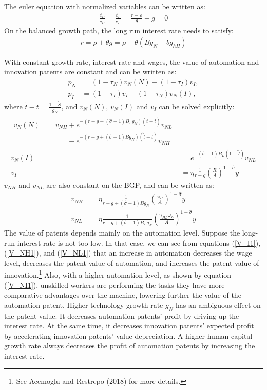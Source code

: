 \documentclass[12pt]{article}
\begin{document}
The euler equation with normalized variables can be written as: 
\begin{align*}
\frac{\dot{c_H}}{c_H} = \frac{\dot{c_L}}{c_L} = \frac{r-\rho}{\theta}-g = 0 
\end{align*}
On the balanced growth path, the long run interest rate needs to satisfy: 
\begin{align}
\label{LRR}
r = \rho+\theta g = \rho+\theta(Bg_N+bg_{hH})
\end{align}

With constant growth rate, interest rate and wages, the value of automation and innovation patents are constant and can be written as: 
\begin{align}
p_N &= (1-\tau_N)v_N(N)-(1-\tau_I)v_I,\\
p_I &= (1-\tau_I)v_I-(1-\tau_N)v_N(I), 
\end{align}
where $\tilde{t}-t =\frac{1-\tilde{S}}{g_N}$, and $v_N(N)$, $v_N(I)$ and $v_I$ can be solved explicitly: 
\begin{align}
\label{V_NN1}
\begin{split}
v_N(N) &= v_{NH}+e^{-(r-g+(\hat{\sigma}-1)B_Lg_N)(\tilde{t}-t)}v_{NL} \\
&\quad \quad \quad -e^{-(r-g+(\hat{\sigma}-1)Bg_N)(\tilde{t}-t)}v_{NH} 
\end{split} \\
\label{V_NI1} 
v_N(I) &=e^{-(\hat{\sigma}-1)B_L(1-\tilde{I})}v_{NL} \\
\label{V_I1}
v_I &= \eta\frac{1}{r-g}(\frac{R}{A})^{1-\hat{\sigma}}y
\end{align}
$v_{NH}$ and $v_{NL}$ are also constant on the BGP, and can be written as: 
\begin{align}
\label{V_NH1} 
v_{NH} &= \eta\frac{1}{r-g+(\hat{\sigma}-1)Bg_N}(\frac{\omega_H}{A})^{1-\hat{\sigma}}y \\
\label{V_NL1} 
v_{NL} &=\eta \frac{1}{r-g+(\hat{\sigma}-1)B_Lg_N}(\frac{\gamma_{HL}\omega_L}{A})^{1-\hat{\sigma}}y 
\end{align}
The value of patents depends mainly on the automation level. Suppose the long-run interest rate is not too low. In that case, we can see from equations (\ref{V_I1}), (\ref{V_NH1}), and (\ref{V_NL1}) that an increase in automation decreases the wage level, decreases the patent value of automation, and increases the patent value of innovation.\footnote{See Acemoglu and Restrepo (2018)\nocite{AcemogluRestrepo2018} for more details.} Also, with a higher automation level, as shown by equation (\ref{V_NI1}), unskilled workers are performing the tasks they have more comparative advantages over the machine, lowering further the value of the automation patent. Higher technology growth rate $g_N$ has an ambiguous effect on the patent value. It decreases automation patents' profit by driving up the interest rate. At the same time, it decreases innovation patents' expected profit by accelerating innovation patents' value depreciation. A higher human capital growth rate always decreases the profit of automation patents by increasing the interest rate. 
\end{document}

